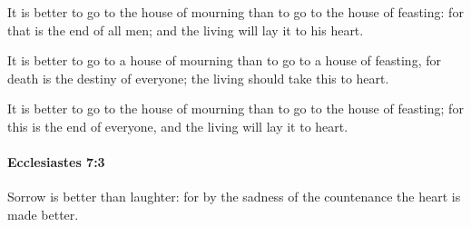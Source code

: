 			\begin{versebox}
					\item[BHS] 
					\item[LXX] 
					\item[ASV] It is better to go to the house of mourning than to go to the house of feasting: for that is the end of all men; and the living will lay it to his heart.
					\item[NIV] It is better to go to a house of mourning than to go to a house of feasting, for death is the destiny of everyone; the living should take this to heart.
					\item[NRSV] It is better to go to the house of mourning than to go to the house of feasting; for this is the end of everyone, and the living will lay it to heart.
			\end{versebox}

		\paragraph{Ecclesiastes 7:3} %
			\label{ECCLESIASTES-7-3}

			Sorrow is better than laughter: for by the sadness of the countenance the heart is made better.

